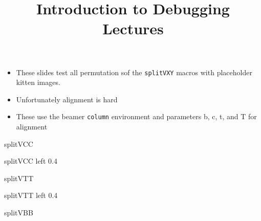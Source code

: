 \documentclass[11pt,compress,t,notes=noshow, xcolor=table]{beamer}
\title{Introduction to Debugging Lectures}
\begin{document}

\begin{frame}
  \begin{itemize}
    \item These slides test all permutation sof the \texttt{splitVXY} macros with placeholder kitten images.
    \item Unfortunately alignment is hard
    \item These use the beamer \texttt{column} environment and parameters b, c, t, and T for alignment
  \end{itemize}

\end{frame}

\begin{frame}{splitVCC}


\end{frame}

\begin{frame}{splitVCC left 0.4}


\end{frame}

\begin{frame}{splitVTT}

  
\end{frame}

\begin{frame}{splitVTT left 0.4}

  
\end{frame}

\begin{frame}{splitVBB}

  
\end{frame}
\end{document}
